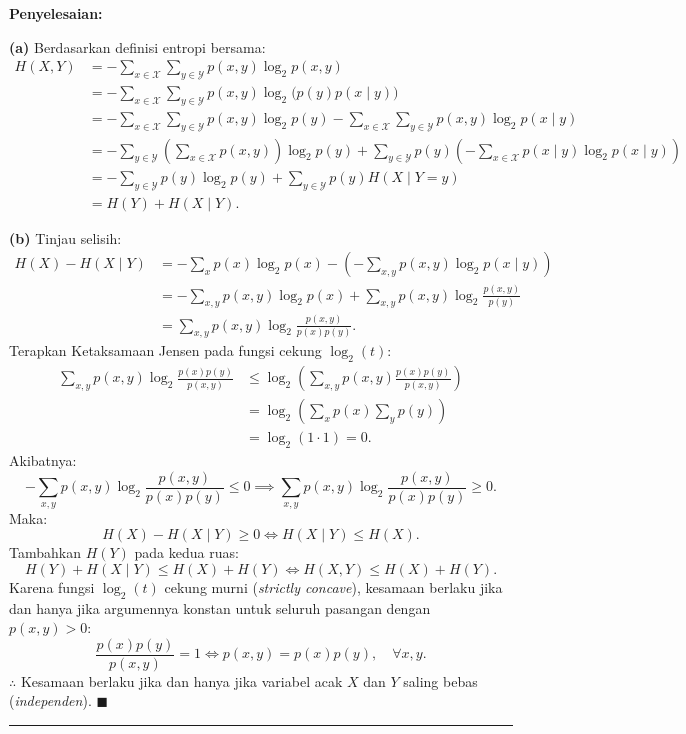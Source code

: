 \documentclass[11pt,a4paper]{article}
\newenvironment{solusi}{\noindent\textbf{\textsf{Penyelesaian:}}\par\vspace{0.2em}}{\hfill$\blacksquare$\vspace{1em}\par\hrule\vspace{1em}}
\begin{document}
\begin{solusi}
\textbf{(a)} Berdasarkan definisi entropi bersama:
\begin{align*}
H(X, Y) &= -\sum_{x \in \mathcal{X}} \sum_{y \in \mathcal{Y}} p(x, y) \log_2 p(x, y) \\
&= -\sum_{x \in \mathcal{X}} \sum_{y \in \mathcal{Y}} p(x, y) \log_2 \big(p(y) p(x \mid y)\big) \\
&= -\sum_{x \in \mathcal{X}} \sum_{y \in \mathcal{Y}} p(x, y) \log_2 p(y) - \sum_{x \in \mathcal{X}} \sum_{y \in \mathcal{Y}} p(x, y) \log_2 p(x \mid y) \\
&= -\sum_{y \in \mathcal{Y}} \left(\sum_{x \in \mathcal{X}} p(x, y)\right) \log_2 p(y) + \sum_{y \in \mathcal{Y}} p(y) \left(-\sum_{x \in \mathcal{X}} p(x \mid y) \log_2 p(x \mid y)\right) \\
&= -\sum_{y \in \mathcal{Y}} p(y) \log_2 p(y) + \sum_{y \in \mathcal{Y}} p(y) H(X \mid Y = y) \\
&= H(Y) + H(X \mid Y).
\end{align*}

\textbf{(b)} Tinjau selisih:
\begin{align*}
H(X) - H(X \mid Y) &= -\sum_{x} p(x) \log_2 p(x) - \left(-\sum_{x, y} p(x, y) \log_2 p(x \mid y)\right) \\
&= -\sum_{x, y} p(x, y) \log_2 p(x) + \sum_{x, y} p(x, y) \log_2 \frac{p(x, y)}{p(y)} \\
&= \sum_{x, y} p(x, y) \log_2 \frac{p(x, y)}{p(x) p(y)}.
\end{align*}
Terapkan Ketaksamaan Jensen pada fungsi cekung $\log_2(t)$:
\begin{align*}
\sum_{x, y} p(x, y) \log_2 \frac{p(x) p(y)}{p(x, y)} &\le \log_2\left(\sum_{x, y} p(x, y) \frac{p(x) p(y)}{p(x, y)}\right) \\
&= \log_2\left(\sum_{x} p(x) \sum_{y} p(y)\right) \\
&= \log_2(1 \cdot 1) = 0.
\end{align*}
Akibatnya:
\[
-\sum_{x, y} p(x, y) \log_2 \frac{p(x, y)}{p(x) p(y)} \le 0 \implies \sum_{x, y} p(x, y) \log_2 \frac{p(x, y)}{p(x) p(y)} \ge 0.
\]
Maka:
\[
H(X) - H(X \mid Y) \ge 0 \iff H(X \mid Y) \le H(X).
\]
Tambahkan $H(Y)$ pada kedua ruas:
\[
H(Y) + H(X \mid Y) \le H(X) + H(Y) \iff H(X, Y) \le H(X) + H(Y).
\]
Karena fungsi $\log_2(t)$ cekung murni (\textit{strictly concave}), kesamaan berlaku jika dan hanya jika argumennya konstan untuk seluruh pasangan dengan $p(x, y) > 0$:
\[
\frac{p(x) p(y)}{p(x, y)} = 1 \iff p(x, y) = p(x) p(y), \quad \forall x, y.
\]
$\therefore$ Kesamaan berlaku jika dan hanya jika variabel acak $X$ dan $Y$ saling bebas (\textit{independen}).
\end{solusi}
\end{document}
